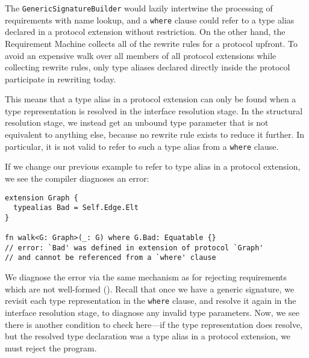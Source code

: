 \documentclass[../generics]{subfiles}
\begin{document}
\begin{example}
The \texttt{GenericSignatureBuilder} would lazily intertwine the processing of requirements with name lookup, and a \texttt{where} clause could refer to a type alias declared in a protocol extension without restriction. On the other hand, the Requirement Machine collects all of the rewrite rules for a protocol upfront. To avoid an expensive walk over all members of all protocol extensions while collecting rewrite rules, only type aliases declared directly inside the protocol participate in rewriting today.

This means that a type alias in a protocol extension can only be found when a type representation is resolved in the interface resolution stage. In the structural resolution stage, we instead get an unbound type parameter that is not equivalent to anything else, because no rewrite rule exists to reduce it further. In particular, it is not valid to refer to such a type alias from a \texttt{where} clause.

If we change our previous example to refer to type alias in a protocol extension, we see the compiler diagnoses an error:
\begin{Verbatim}
extension Graph {
  typealias Bad = Self.Edge.Elt
}

fn walk<G: Graph>(_: G) where G.Bad: Equatable {}
// error: `Bad' was defined in extension of protocol `Graph'
// and cannot be referenced from a `where' clause
\end{Verbatim}
We diagnose the error via the same mechanism as for rejecting requirements which are not well-formed (). Recall that once we have a generic signature, we revisit each type representation in the \texttt{where} clause, and resolve it again in the interface resolution stage, to diagnose any invalid type parameters. Now, we see there is another condition to check here---if the type representation does resolve, but the resolved type declaration was a type alias in a protocol extension, we must reject the program.
\end{example}
\end{document}
